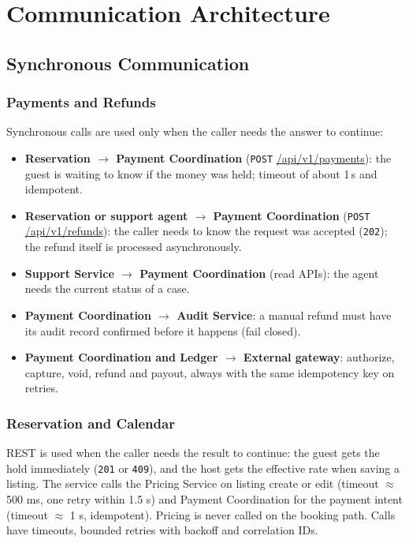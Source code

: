 \section{Communication Architecture}




\subsection{Synchronous Communication}

\subsubsection{Payments and Refunds}
\label{sec:pay-sync}

Synchronous calls are used only when the caller needs the answer to continue:
\begin{itemize}
  \item \textbf{Reservation $\rightarrow$ Payment Coordination}
    (\texttt{POST} \url{/api/v1/payments}): the guest is waiting to know if the
    money was held; timeout of about 1\,s and idempotent.
  \item \textbf{Reservation or support agent $\rightarrow$ Payment
    Coordination} (\texttt{POST} \url{/api/v1/refunds}): the caller needs to
    know the request was accepted (\texttt{202}); the refund itself is
    processed asynchronously.
  \item \textbf{Support Service $\rightarrow$ Payment Coordination}
    (read APIs): the agent needs the current status of a case.
  \item \textbf{Payment Coordination $\rightarrow$ Audit Service}: a manual
    refund must have its audit record confirmed before it happens (fail
    closed).
  \item \textbf{Payment Coordination and Ledger $\rightarrow$ External
    gateway}: authorize, capture, void, refund and payout, always with the
    same idempotency key on retries.
\end{itemize}

\subsubsection{Reservation and Calendar}
REST is used when the caller needs the result to continue: the guest gets the
hold immediately (\texttt{201} or \texttt{409}), and the host gets the effective
rate when saving a listing. The service calls the Pricing Service on listing
create or edit (timeout $\approx$ 500 ms, one retry within 1.5 s) and Payment
Coordination for the payment intent (timeout $\approx$ 1 s, idempotent). Pricing
is never called on the booking path. Calls have timeouts, bounded retries with
backoff and correlation IDs.

